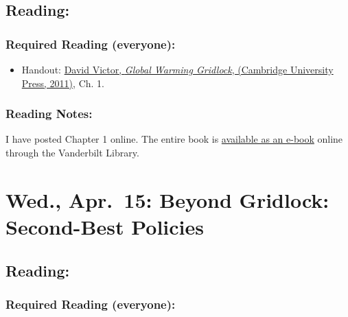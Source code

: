 \documentclass[
]{article}
\providecommand{\tightlist}{%
  \setlength{\itemsep}{0pt}\setlength{\parskip}{0pt}}
\begin{document}
\hypertarget{reading-38}{%
\subsection{Reading:}\label{reading-38}}

\hypertarget{required-reading-everyone-33}{%
\subsubsection{Required Reading
(everyone):}\label{required-reading-everyone-33}}

\begin{itemize}
\tightlist
\item
  Handout:
  \href{/files/reading_handouts/Victor_GlobalWarmingGridlock_Chapter01.pdf}{David
  Victor, \emph{Global Warming Gridlock}, (Cambridge University Press,
  2011)}, Ch. 1.
\end{itemize}

\hypertarget{reading-notes-29}{%
\subsubsection{Reading Notes:}\label{reading-notes-29}}

I have posted Chapter 1 online. The entire book is
\href{https://catalog.library.vanderbilt.edu/discovery/fulldisplay?docid=cambookslvl10.1017/CBO9780511975714\&context=PC\&vid=01VAN_INST:vanui\&search_scope=MyInst_and_CI\&tab=Everything\&lang=en}{available
as an e-book} online through the Vanderbilt Library.

\hypertarget{wed.-apr.-15-beyond-gridlock-second-best-policies}{%
\section{Wed., Apr.~15: Beyond Gridlock: Second-Best
Policies}\label{wed.-apr.-15-beyond-gridlock-second-best-policies}}

\hypertarget{reading-39}{%
\subsection{Reading:}\label{reading-39}}

\hypertarget{required-reading-everyone-34}{%
\subsubsection{Required Reading
(everyone):}\label{required-reading-everyone-34}}
\end{document}
